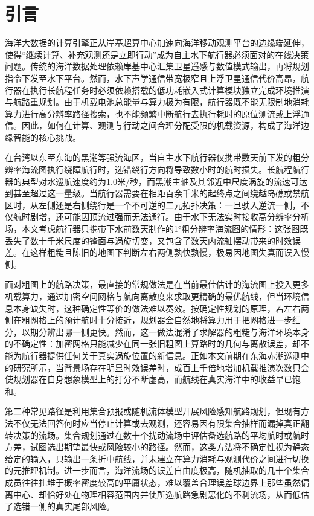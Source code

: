 \section{引言}

海洋大数据的计算引擎正从岸基超算中心加速向海洋移动观测平台的边缘端延伸，使得“继续计算、补充观测还是立即行动”成为自主水下航行器必须面对的在线决策问题。传统的海洋数据处理依赖岸基中心汇集卫星遥感与数值模式输出，再将规划指令下发至水下平台\cite{chassignet2007hycom,chin2017mur}。然而，水下声学通信带宽极窄且上浮卫星通信代价高昂，航行器在执行长航程任务时必须依赖搭载的低功耗嵌入式计算模块独立完成环境推演与航路重规划\cite{remus100,jetsonorinnx}。由于机载电池总能量与算力极为有限，航行器既不能无限制地消耗算力进行高分辨率路径搜索，也不能频繁中断航行去执行耗时的原位测流或上浮通信\cite{horvitz1987reasoning,russell1991right}。因此，如何在计算、观测与行动之间合理分配受限的机载资源，构成了海洋边缘智能的核心挑战\cite{sung2021quit,magnino2026metareasoning}。

在台湾以东至东海的黑潮等强流海区，当自主水下航行器仅携带数天前下发的粗分辨率海流图执行绕障航行时，选错绕行方向将导致数小时的航时损失。长航程航行器的典型对水巡航速度约为1.0米/秒，而黑潮主轴及其邻近中尺度涡旋的流速可达到甚至超过这一量级。当航行器需要在相距百余千米的起终点之间绕越岛礁或禁航区时，从左侧还是右侧绕行是一个不可逆的二元拓扑决策：一旦驶入逆流一侧，不仅航时剧增，还可能因顶流过强而无法通行。由于水下无法实时接收高分辨率分析场，本文考虑航行器只携带下水前数天制作的1°粗分辨率海流图的情形：这张图既丢失了数十千米尺度的锋面与涡旋切变，又包含了数天内流轴摆动带来的时效误差。在这样粗糙且陈旧的地图下判断左右两侧孰快孰慢，极易因地图失真而误入慢侧。

面对粗图上的航路决策，最直接的常规做法是在当前最佳估计的海流图上投入更多机载算力，通过加密空间网格与航向离散度来求取更精确的最优航线\cite{lolla2014levelset}，但当环境信息本身缺失时，这种确定性等价的做法难以奏效。按确定性规划的原理，若左右两侧在粗网格上的预计航时十分接近，规划器会自然地将算力用于把网格进一步细分，以期分辨出哪一侧更快。然而，这一做法混淆了求解器的粗糙与海洋环境本身的不确定性：加密网格只能减少在同一张旧粗图上算路时的几何与离散误差，却不能为航行器提供任何关于真实涡旋位置的新信息\cite{jiang2015horizon,cuadron2025overthinking}。正如本文前期在东海赤潮巡测中的研究所示，当背景场存在明显时效误差时，成百上千倍地增加机载推演次数只会使规划器在自身想象模型上的打分不断虚高，而航线在真实海洋中的收益早已饱和\cite{smith2006curse}。

第二种常见路径是利用集合预报或随机流体模型开展风险感知航路规划，但现有方法不仅无法回答何时应当停止计算或去观测，还容易因有限集合抽样而漏掉真正翻转决策的流场\cite{wang2016path,subramani2018stochastic,kularatne2018forecast}。集合规划通过在数十个扰动流场中评估备选航路的平均航时或航时方差，试图选出期望最快或风险较小的路径。然而，这类方法将不确定性视为静态给定的输入，只输出一条折中航线，并未建立在算力消耗与观测代价之间进行切换的元推理机制\cite{lin2015metareasoning,elboher2023formal}。进一步而言，海洋流场的误差自由度极高，随机抽取的几十个集合成员往往扎堆于概率密度较高的平庸状态，难以覆盖合理误差球边界上那些虽然偏离中心、却恰好处在物理相容范围内并使所选航路急剧恶化的不利流场，从而低估了选错一侧的真实尾部风险\cite{benhaim2006infogap,marx2020predictive}。

